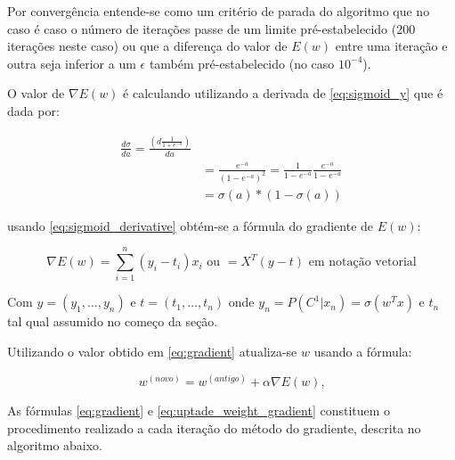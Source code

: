 Por convergência entende-se como um critério de parada do algoritmo que no caso é caso o número de
iterações passe de um limite pré-estabelecido (200 iterações neste caso) ou que a diferença do valor
de $E(w)$ entre uma iteração e outra seja inferior a um $\epsilon$ também pré-estabelecido (no caso
$10^{-4}$).

O valor de $\nabla E(w)$ é calculando utilizando a derivada de \ref{eq:sigmoid_y} que é dada
por:

\begin{center}
	\begin{equation}
		\begin{split}
		\label{eq:sigmoid_derivative}
			\frac{d \sigma}{d a} = \frac{\left(d \frac{1}{1 + e^{-a}}\right)}{d a} \\
				& = \frac{e^{-a}}{(1 - e^{-a})^2} = \frac{1}{1 - e^{-a}}\frac{e^{-a}}{1 - e^{-a}} \\
				& = \sigma(a)*(1 - \sigma(a))
		\end{split}
	\end{equation}
\end{center}

usando \ref{eq:sigmoid_derivative} obtém-se a fórmula do gradiente de $E(w)$:

\begin{center}
	\begin{equation}\label{eq:gradient}
		\nabla E(w) = \sum_{i =  1}^{n}(y_i - t_i)x_i \text{ ou } = X^T(y - t) \text{ em notação vetorial}
	\end{equation}
\end{center}

Com $y = (y_1, \ldots, y_n)$ e $t = (t_1, \ldots, t_n)$ onde
$y_n = P(C^1 | x_n) = \sigma(w^Tx)$ e $t_n$ tal qual assumido no começo da seção.

Utilizando o valor obtido em \ref{eq:gradient} atualiza-se $w$ usando a fórmula:

\begin{center}
	\begin{equation}
		\label{eq:uptade_weight_gradient}
		w^{ ( novo )} = w^{ (antigo) }  + \alpha \nabla E(w)\text{,}
	\end{equation}
\end{center}

As fórmulas \ref{eq:gradient} e \ref{eq:uptade_weight_gradient} constituem o procedimento
realizado a cada iteração do método do gradiente, descrita no algoritmo abaixo.

